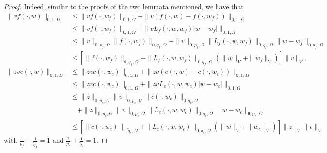 \documentclass[10pt,a4paper]{amsart}
\providecommand{\Om}{\Omega}
\begin{document}
\begin{proof}
Indeed, similar to the proofs of the two lemmata mentioned, we have that
\begin{align*}
\|vf(\cdot,w)\|_{0,1,\Om}
&\le \|vf(\cdot,w_f)\|_{0,1,\Om} + \|v(f(\cdot,w) - f(\cdot,w_f))\|_{0,1,\Om}\\
&\le \|vf(\cdot,w_f)\|_{0,1,\Om} + \|vL_f(\cdot,w,w_f) |w-w_f|\|_{0,1,\Om}\\
&\le \|v\|_{0,p_f,\Om}\|f(\cdot,w_f)\|_{0,\tilde{q}_f,\Om}
+ \|v\|_{0,p_f,\Om}\|L_f(\cdot,w,w_f)\|_{0,q_f,\Om}\|w-w_f\|_{0,p_f,\Om}\\
&\le \left[\|f(\cdot,w_f)\|_{0,\tilde{q}_f,\Om}
+ \|L_f(\cdot,w,w_f)\|_{0,q_f,\Om}(\|w\|_V + \|w_f\|_V)\right]\|v\|_V,\\
\|zvc(\cdot,w)\|_{0,1,\Om}
&\le \|zvc(\cdot,w_c)\|_{0,1,\Om} + \|zv(c(\cdot,w) - c(\cdot,w_c))\|_{0,1,\Om}\\
&\le \|zvc(\cdot,w_c)\|_{0,1,\Om} + \|zvL_c(\cdot,w,w_c) |w-w_c|\|_{0,1,\Om}\\
&\le \|z\|_{0,p_c,\Om}\|v\|_{0,p_c,\Om}\|c(\cdot,w_c)\|_{0,\tilde{q}_c,\Om}\\
&\quad + \|z\|_{0,p_c,\Om}\|v\|_{0,p_c,\Om}\|L_c(\cdot,w,w_c)\|_{0,q_c,\Om}\|w-w_c\|_{0,p_c,\Om}\\
&\le \left[\|c(\cdot,w_c)\|_{0,\tilde{q}_c,\Om}
+ \|L_c(\cdot,w,w_c)\|_{0,q_c,\Om}(\|w\|_V + \|w_c\|_V)\right]\|z\|_V\|v\|_V
\end{align*}
with
$\frac{1}{p_f}+\frac{1}{\tilde{q}_f}=1$
and
$\frac{2}{p_c}+\frac{1}{\tilde{q}_c}=1$.
\end{proof}
\end{document}

